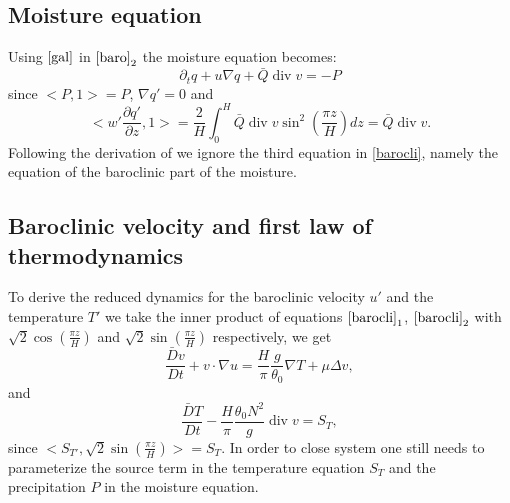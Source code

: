 \documentclass[11pt, a4paper, article,reqno,]{amsart}
\theoremstyle{remark}
\DeclareMathOperator{\dive}{div}
\numberwithin{equation}{section}
\begin{document}
\subsection*{Moisture equation}
Using $\eqref{gal}$ in $\eqref{baro}_2$ the moisture equation becomes:
\begin{equation}\label{gen_most}
   \partial_t q + u\nabla q + \bar{Q}\dive v = -P
\end{equation}
since $<P,1> = P$, $\nabla q'=0$ and 
\begin{equation*}
    < w' \frac{\partial q'}{\partial z}, 1 > = \frac{2}{H} \int_0^H \bar{Q} \dive v \sin^2\left(\frac{\pi z}{H} \right) dz = \bar{Q} \dive v.
\end{equation*}
Following the derivation of \cite{FM} we ignore the third equation in \eqref{barocli}, namely the equation of the baroclinic part of the moisture. 

\subsection*{Baroclinic velocity and first law of thermodynamics}
To derive the reduced dynamics for the baroclinic velocity $u'$ and the temperature $T'$ we take the
inner product of equations $\eqref{barocli}_1$, $\eqref{barocli}_2$  with $\sqrt{2} \cos \left( \frac{\pi z}{H} \right)$ and $\sqrt{2} \sin \left( \frac{\pi z}{H} \right)$ respectively, we get
\begin{equation}\label{baroclivel}
    \frac{\bar{D}v}{Dt} + v \cdot \nabla u = \frac{H}{\pi} \frac{g}{\theta_0} \nabla T + \mu \Delta v,
\end{equation}
and
\begin{equation*}
    \frac{\bar{D}T}{Dt} - \frac{H}{\pi}\frac{\theta_0 N^2}{g}\dive v = S_{T},
\end{equation*}
since $< S_{T'}, \sqrt{2} \sin \left( \frac{\pi z}{H} \right)> = S_T$. In order to close system one still needs to parameterize the source term  in the temperature equation $S_T$ and the precipitation $P$ in the moisture equation.
\end{document}
